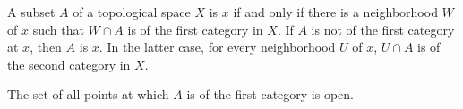 A subset $A$ of a topological space $X$ is  $x$ if and only if there is a neighborhood $W$ of $x$ such that $W \cap A$ is of the first category in $X$. If $A$ is not of the first category at $x$, then $A$ is  $x$. In the latter case, for every neighborhood $U$ of $x$, $U \cap A$ is of the second category in $X$.

The set of all points at which $A$ is of the first category is open.
